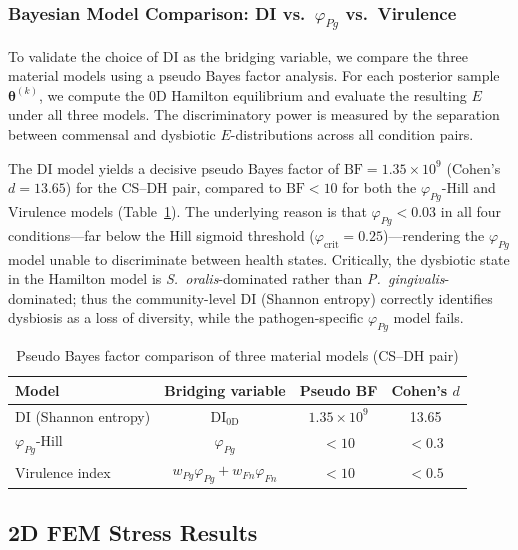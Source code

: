 \documentclass[11pt,a4paper]{article}
\begin{document}
\subsubsection[Bayesian Model Comparison: DI vs phi-Pg vs Virulence]{Bayesian Model Comparison: DI vs.\ \texorpdfstring{$\varphi_{Pg}$}{phi-Pg} vs.\ Virulence}
\label{sec:3model_bayes}

To validate the choice of DI as the bridging variable, we compare the three material models using a pseudo Bayes factor analysis.
For each posterior sample $\boldsymbol{\theta}^{(k)}$, we compute the 0D Hamilton equilibrium and evaluate the resulting $E$ under all three models.
The discriminatory power is measured by the separation between commensal and dysbiotic $E$-distributions across all condition pairs.

The DI model yields a decisive pseudo Bayes factor of $\mathrm{BF} = 1.35 \times 10^9$ (Cohen's $d = 13.65$) for the CS--DH pair, compared to $\mathrm{BF} < 10$ for both the $\varphi_{Pg}$-Hill and Virulence models (Table~\ref{tab:bayes_factor}).
The underlying reason is that $\varphi_{Pg} < 0.03$ in all four conditions---far below the Hill sigmoid threshold ($\varphi_\mathrm{crit} = 0.25$)---rendering the $\varphi_{Pg}$ model unable to discriminate between health states.
Critically, the dysbiotic state in the Hamilton model is \textit{S.~oralis}-dominated rather than \textit{P.~gingivalis}-dominated; thus the community-level DI (Shannon entropy) correctly identifies dysbiosis as a loss of diversity, while the pathogen-specific $\varphi_{Pg}$ model fails.

\begin{table}[H]
\centering
\caption{Pseudo Bayes factor comparison of three material models (CS--DH pair)}
\label{tab:bayes_factor}
\begin{tabular}{lccc}
\toprule
\textbf{Model} & \textbf{Bridging variable} & \textbf{Pseudo BF} & \textbf{Cohen's $d$} \\
\midrule
DI (Shannon entropy) & $\mathrm{DI}_\text{0D}$ & $1.35 \times 10^9$ & 13.65 \\
$\varphi_{Pg}$-Hill  & $\varphi_{Pg}$            & $< 10$             & $< 0.3$ \\
Virulence index      & $w_{Pg}\varphi_{Pg} + w_{Fn}\varphi_{Fn}$ & $< 10$ & $< 0.5$ \\
\bottomrule
\end{tabular}
\end{table}

\subsection{2D FEM Stress Results}
\end{document}
